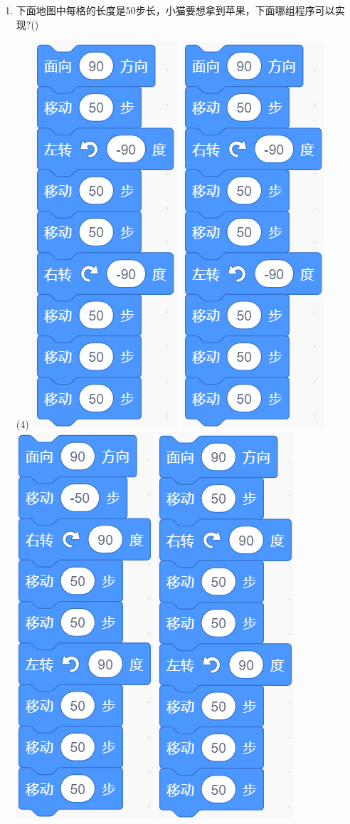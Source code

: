 \documentclass[10.5pt, a4paper]{article}
\begin{document}
\begin{enumerate}
        \newpage
        \item 下面地图中每格的长度是50步长，小猫要想拿到苹果，下面哪组程序可以实现?(\qquad)
        \begin{tasks}(4)
            \task \includegraphics[width=.12\textwidth]{7a.png}
            \task \includegraphics[width=.12\textwidth]{7b.png}
            \task \includegraphics[width=.12\textwidth]{7c.png}
            \task \includegraphics[width=.12\textwidth]{7d.png}
        \end{tasks}
        

\end{enumerate}
\end{document}

